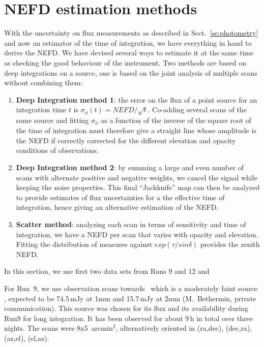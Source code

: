 \section{NEFD estimation methods}
\label{se:nefd_estimation_methods}

With the uncertainty on flux measurements as described in Sect.~\ref{se:photometry} and
now an estimator of the time of integration, we have everything in hand to derive
the NEFD. We have devised several ways to estimate it at the same time as
checking the good behaviour of the instrument. Two methods are based on deep
integrations on a source, one is based on the joint analysis of multiple scans
without combining them:

\begin{enumerate}
\item {\bf Deep Integration method 1}: the error on the flux of a point source for an
  integration time $t$ is $\sigma_\phi(t) = NEFD/\sqrt{t}$. Co-adding several scans of
  the same source and fitting $\sigma_\phi$ as a function of the
  inverse of the square root of the
  time of integration must therefore give a straight line whose
  amplitude is the NEFD if correctly corrected for the different elevation and
  opacity conditions of observations.
\item {\bf Deep Integration method 2}: by summing a large and even number of scans
  with alternate positive and negative weights, we cancel the signal while
  keeping the noise properties. This final ``Jackknife'' map can then be analyzed
  to provide estimates of flux uncertainties for a the effective time of
  integration, hence giving an alternative estimation of the NEFD.
\item {\bf Scatter method}: analyzing each scan in terms of sensitivity and
  time of integration, we have a NEFD per scan that varies with opacity and
  elevation. Fitting the distribution of measures against $exp(\tau/sin\delta)$
  provides the zenith NEFD.
\end{enumerate}

In this section, we use first two data sets from Runs 9 and 12 and

For Run~9, we use observation scans towards \hls\, which is a
moderately faint source \cite{hls_combes}, expected to be
74.5\,mJy at 1mm and 15.7\,mJy at 2mm (M.~Bethermin, private
communication). This source was chosen for its flux and its availability during
Run9 for long integration. It has been observed for about 9\,h in total over
three nights. The scans were 8x5~arcmin$^2$, alternatively oriented in (ra,dec),
(dec,ra), (az,el), (el,az). 

